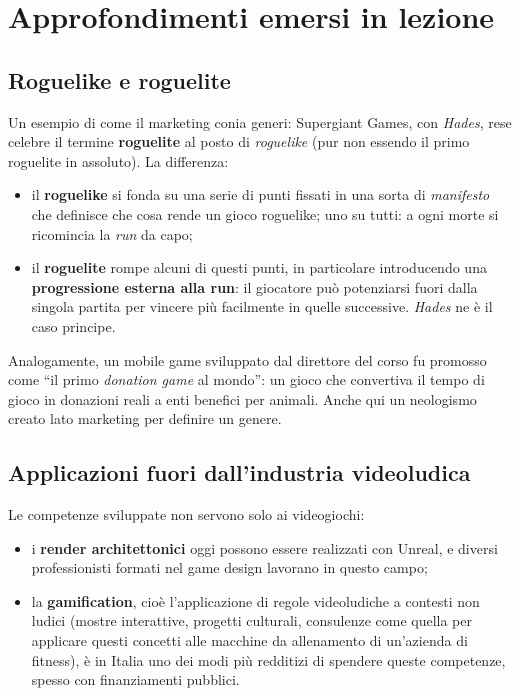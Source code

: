 \section{Approfondimenti emersi in lezione}
\label{sec:approfondimenti}

\subsection{Roguelike e roguelite}

Un esempio di come il marketing conia generi: Supergiant Games, con
\emph{Hades}, rese celebre il termine \textbf{roguelite} al posto di
\emph{roguelike} (pur non essendo il primo roguelite in assoluto). La
differenza:
\begin{itemize}
  \item il \textbf{roguelike} si fonda su una serie di punti fissati in una
        sorta di \emph{manifesto} che definisce che cosa rende un gioco
        roguelike; uno su tutti: a ogni morte si ricomincia la \emph{run} da
        capo;
  \item il \textbf{roguelite} rompe alcuni di questi punti, in particolare
        introducendo una \textbf{progressione esterna alla run}: il giocatore
        può potenziarsi fuori dalla singola partita per vincere più
        facilmente in quelle successive. \emph{Hades} ne è il caso principe.
\end{itemize}
Analogamente, un mobile game sviluppato dal direttore del corso fu
promosso come ``il primo \emph{donation game} al mondo'': un gioco che
convertiva il tempo di gioco in donazioni reali a enti benefici per animali.
Anche qui un neologismo creato lato marketing per definire un genere.

\subsection{Applicazioni fuori dall'industria videoludica}

Le competenze sviluppate non servono solo ai videogiochi:
\begin{itemize}
  \item i \textbf{render architettonici} oggi possono essere realizzati con
        Unreal, e diversi professionisti formati nel game design lavorano in
        questo campo;
  \item la \textbf{gamification}, cioè l'applicazione di regole videoludiche
        a contesti non ludici (mostre interattive, progetti culturali,
        consulenze come quella per applicare questi concetti alle macchine da
        allenamento di un'azienda di fitness), è in Italia uno dei modi più
        redditizi di spendere queste competenze, spesso con finanziamenti
        pubblici.
\end{itemize}

